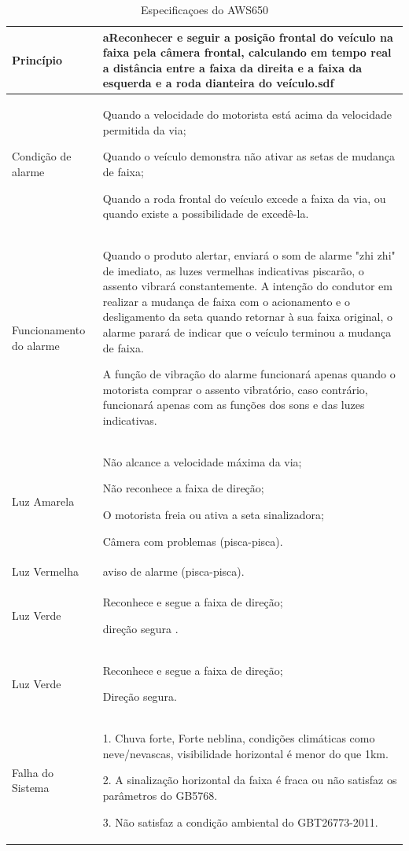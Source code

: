 \begin{table}[ht]
\caption{Especificaçoes do AWS650}
\centering
\begin{tabular}{| l |  p{10cm} |}
\hline
Princípio & aReconhecer e seguir a posição frontal do veículo na faixa pela câmera frontal, calculando em tempo real a distância entre a faixa da direita e a faixa da esquerda e a roda dianteira do veículo.sdf\\
\hline
Condição de alarme & Quando a velocidade do motorista está acima da velocidade permitida da via;

Quando o veículo demonstra não ativar as setas de mudança de faixa;

Quando a roda frontal do veículo excede a faixa da via, ou quando existe a possibilidade de excedê-la.

\\
\hline
Funcionamento do alarme & Quando o produto alertar, enviará o som de alarme "zhi zhi" de imediato, as luzes vermelhas indicativas piscarão, o assento vibrará constantemente. A intenção do condutor em realizar a mudança de faixa com o acionamento e o desligamento da seta quando retornar à sua faixa original, o alarme parará de indicar que o veículo terminou a mudança de faixa.

A função de vibração do alarme funcionará apenas quando o motorista comprar o assento vibratório, caso contrário, funcionará apenas com as funções dos sons e das luzes indicativas.\\

\hline
Luz Amarela & Não alcance a velocidade máxima da via;

Não reconhece a faixa de direção;

O motorista freia ou ativa a seta sinalizadora;

Câmera com problemas (pisca-pisca).\\
\hline
Luz Vermelha & aviso de alarme (pisca-pisca).\\
\hline
Luz Verde & Reconhece e segue a faixa de direção;

direção segura .\\
\hline
Luz Verde & Reconhece e segue a faixa de direção;

Direção segura.\\
\hline
Falha do Sistema & 1. Chuva forte, Forte neblina, condições climáticas como neve/nevascas, visibilidade horizontal é menor do que 1km.

2. A sinalização horizontal da faixa é fraca ou não satisfaz os parâmetros do GB5768.

3. Não satisfaz a condição ambiental do GBT26773-2011.
\\
\hline
\end{tabular}
\label{table:funcionamento_aws650}
\end{table}

